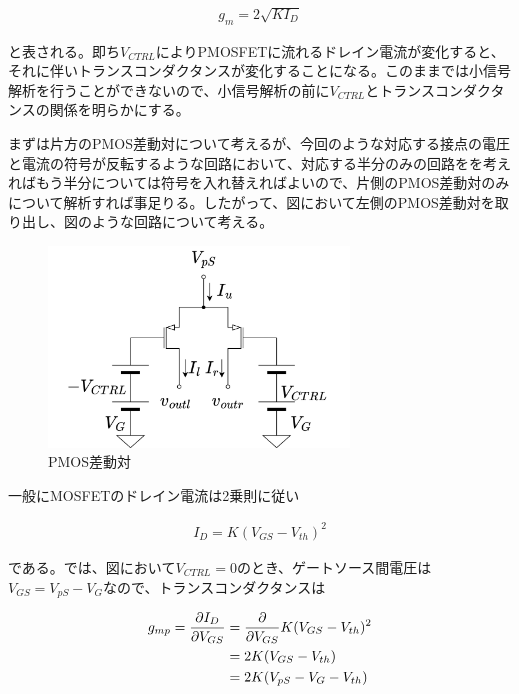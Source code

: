 \documentclass[twocolumn]{jsarticle}
\begin{document}
\begin{align}
    g_{m}=2\sqrt{KI_{D}} \label{eq:gm}
\end{align}

と表される。即ち$V_{CTRL}$によりPMOSFETに流れるドレイン電流が変化すると、それに伴いトランスコンダクタンスが変化することになる。このままでは小信号解析を行うことができないので、小信号解析の前に$V_{CTRL}$とトランスコンダクタンスの関係を明らかにする。\par
まずは片方のPMOS差動対について考えるが、今回のような対応する接点の電圧と電流の符号が反転するような回路において、対応する半分のみの回路をを考えればもう半分については符号を入れ替えればよいので、片側のPMOS差動対のみについて解析すれば事足りる。したがって、図において左側のPMOS差動対を取り出し、図のような回路について考える。

\begin{figure}[h]
    \begin{center}
        \includegraphics*[width=80mm]{figures/pmos_diff.png}
        \caption{PMOS差動対}
        \label{fig:pmos_diff}
    \end{center}
\end{figure}%

一般にMOSFETのドレイン電流は2乗則に従い

\begin{align}
    I_{D}=K(V_{GS}-V_{th})^{2}  \label{eq:square}
\end{align}

である。では、図において$V_{CTRL}=0$のとき、ゲートソース間電圧は$V_{GS}=V_{pS}-V_{G}$なので、トランスコンダクタンスは

\begin{align}
    g_{mp} = \frac{\partial I_{D}}{\partial V_{GS}} &= \frac{\partial}{\partial V_{GS}} K(V_{GS}-V_{th})^{2} \notag\\
    &=2K(V_{GS}-V_{th})    \notag\\ 
    &=2K(V_{pS}-V_{G}-V_{th})   \label{eq:g_mp}
\end{align}
\end{document}
